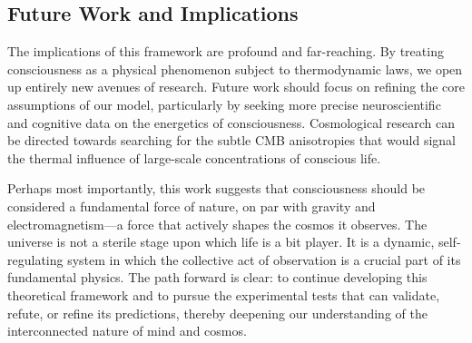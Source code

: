 \documentclass[11pt,a4paper]{article}
\theoremstyle{definition}
\theoremstyle{remark}
\begin{document}
\subsection{Future Work and Implications}
The implications of this framework are profound and far-reaching. By treating consciousness as a physical phenomenon subject to thermodynamic laws, we open up entirely new avenues of research. Future work should focus on refining the core assumptions of our model, particularly by seeking more precise neuroscientific and cognitive data on the energetics of consciousness. Cosmological research can be directed towards searching for the subtle CMB anisotropies that would signal the thermal influence of large-scale concentrations of conscious life.

Perhaps most importantly, this work suggests that consciousness should be considered a fundamental force of nature, on par with gravity and electromagnetism—a force that actively shapes the cosmos it observes. The universe is not a sterile stage upon which life is a bit player. It is a dynamic, self-regulating system in which the collective act of observation is a crucial part of its fundamental physics. The path forward is clear: to continue developing this theoretical framework and to pursue the experimental tests that can validate, refute, or refine its predictions, thereby deepening our understanding of the interconnected nature of mind and cosmos.
\end{document}
